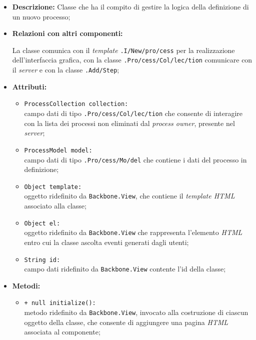 \begin{flushleft}
\begin{itemize}
\item \textbf{Descrizione:} Classe che ha il compito di gestire la logica della definizione di un nuovo processo;
\item \textbf{Relazioni con altri componenti:}
\begin{sloppypar}
La classe comunica con il \textit{template} \texttt{\viewAdmin{}.I\fshyp{}New\fshyp{}pro\fshyp{}cess} per la realizzazione dell'interfaccia grafica, con la classe \texttt{\collection{}.Pro\fshyp{}cess\fshyp{}Col\fshyp{}lec\fshyp{}tion} comunicare con il \textit{server} e con la classe \texttt{\logicAdmin{}.Add\fshyp{}Step};
\end{sloppypar}
\item \textbf{Attributi:}
\begin{sloppypar}
\begin{itemize}
\item \texttt{ProcessCollection collection:}\\ campo dati di tipo \texttt{\collection{}.Pro\fshyp{}cess\fshyp{}Col\fshyp{}lec\fshyp{}tion} che consente di interagire con la lista dei processi non eliminati dal \textit{process owner}, presente nel \textit{server};
\item \texttt{ProcessModel model:}\\ campo dati di tipo \texttt{\model{}.Pro\fshyp{}cess\fshyp{}Mo\fshyp{}del} che contiene i dati del processo in definizione;
\item \texttt{Object template:}\\ oggetto ridefinito da \texttt{Backbone.View}, che contiene il \textit{template HTML} associato alla classe;
\item \texttt{Object el:}\\ oggetto ridefinito da \texttt{Backbone.View} che rappresenta l'elemento \textit{HTML} entro cui la classe ascolta eventi generati dagli utenti;
\item \texttt{String id:}\\ campo dati ridefinito da \texttt{Backbone.View} contente l'id della classe;
\end{itemize}
\end{sloppypar}
\item \textbf{Metodi:}
\begin{sloppypar}
\begin{itemize}
\item \texttt{+ null initialize():}\\ metodo ridefinito da \texttt{Backbone.View}, invocato alla costruzione di ciascun oggetto della classe, che consente di aggiungere una pagina \textit{HTML} associata al componente;

\end{itemize}
\end{sloppypar}
\end{itemize}
\end{flushleft}
